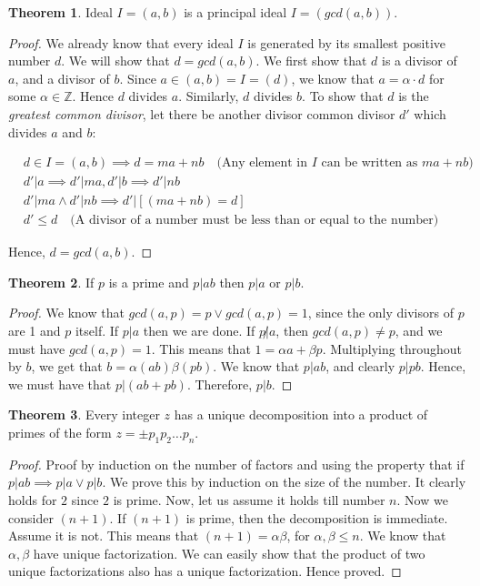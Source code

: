 \documentclass{book}
\newcommand{\Z}{\ensuremath{\mathbb{Z}}}
\theoremstyle{definition}
\newtheorem{theorem}{Theorem}
\begin{document}
\begin{theorem}
Ideal $I = (a, b)$ is a principal ideal $I = (gcd(a, b))$.
\end{theorem}
\begin{proof}
We already know that every ideal $I$ is generated by its smallest positive number $d$.
We will show that $d = gcd(a, b)$. We first show that $d$ is a divisor of $a$, and
a divisor of $b$.
Since $a \in (a, b) = I = (d)$, we know that $a = \alpha \cdot d$
for some $\alpha \in \Z$. Hence $d$ divides $a$. Similarly, $d$ divides $b$.
To show that $d$ is the \emph{greatest common divisor}, let there be another
divisor common divisor $d'$ which divides $a$ and $b$:

\begin{align*}
& d \in I = (a, b) \implies d = ma + nb \quad \text{(Any element in $I$ can be written as $ma + nb$)} \\
&d' | a \implies d' | m a,d' | b \implies d' | n b \\
&d' | m a \land d' | n b \implies d' | [(m a + n b) = d]\\
& d' \leq d \quad \text{(A divisor of a number must be less than or equal to the number)}
\end{align*}             

Hence, $d = gcd(a, b)$.
\end{proof}


\begin{theorem}
If $p$ is a prime and $p | ab$ then $p | a$ or $p | b$.
\end{theorem}
\begin{proof}
We know that $gcd(a, p) = p \lor gcd(a, p) = 1$, since the only divisors of
$p$ are 1 and $p$ itself. If $p | a$ then we are done.
If $p \not| a$, then $gcd(a, p) \neq p$, and we must have $gcd(a, p) = 1$.
This means that $1 = \alpha a + \beta p$. Multiplying throughout by $b$, 
we get that $b = \alpha (ab) \beta (pb)$. We know that $p | ab$, and clearly
$p | pb$. Hence, we must have that $p|(ab + pb)$. Therefore, $p|b$.
\end{proof}


\begin{theorem}
Every integer $z$ has a unique decomposition into a product of primes of
the form ${z = \pm p_1 p_2 \dots p_n}$.
\end{theorem}
\begin{proof}
Proof by induction on the number of factors and using the property that if
$p|ab \implies p|a \lor p|b$. We prove this by induction on the size of
the number. It clearly holds for $2$ since $2$ is prime. Now, let us assume
it holds till number $n$. Now we consider $(n+1)$. If $(n+1)$ is prime,
then the decomposition is immediate. Assume it is not. This means that
$(n+1) = \alpha \beta$, for $\alpha, \beta \leq n$. We know that $\alpha, \beta$
have unique factorization. We can easily show that the product of two unique
factorizations also has a unique factorization. Hence proved.
\end{proof}
\end{document}
